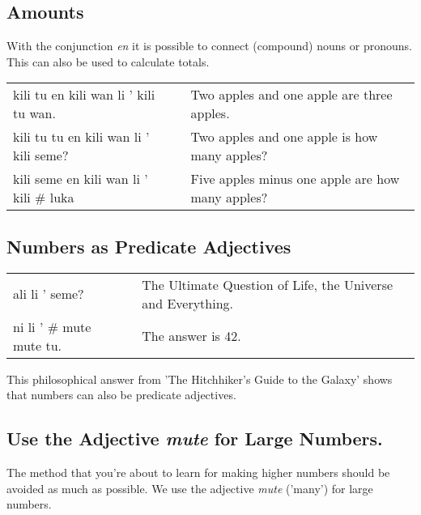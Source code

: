 %
%
\subsection*{Amounts}
%
%
With the conjunction \textit{en} it is possible to connect (compound) nouns or pronouns.
This can also be used to calculate totals.

\begin{supertabular}{p{5,5cm}|ll}
    kili tu en kili wan li ' kili tu wan.   &  & Two apples and one apple are three apples.       \\
    kili tu tu en kili wan li ' kili seme?  &  & Two apples and one apple is how many apples?     \\
    kili seme en kili wan li ' kili \# luka &  & Five apples minus one apple are how many apples? \\
\end{supertabular}

%
%
\subsection*{Numbers as Predicate Adjectives}
%

\begin{supertabular}{p{5,5cm}|ll}
    ali li ' seme?           &  & The Ultimate Question of Life, the Universe and Everything. \\
    ni li ' \# mute mute tu. &  & The answer is 42.                                           \\
\end{supertabular}

This philosophical answer from 'The Hitchhiker's Guide to the Galaxy' shows that numbers can also be predicate adjectives.
%
%
\subsection*{Use the Adjective \textit{mute} for Large Numbers.}
%
%

The method that you're about to learn for making higher numbers should be avoided as much as possible.
We use the adjective \textit{mute} ('many') for large numbers.

